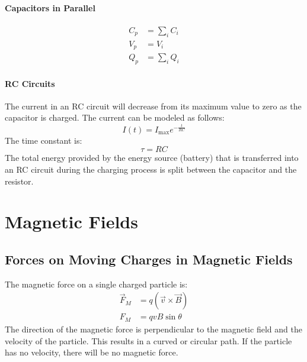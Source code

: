 \documentclass{article}
\begin{document}
            \paragraph{Capacitors in Parallel}
            \begin{align}
                C_p &= \sum_i C_i \\
                V_p &= V_i \\
                Q_p &= \sum_i Q_i
            \end{align}

            \paragraph{RC Circuits}
            The current in an RC circuit will decrease from its maximum value to zero as the capacitor is charged. The current can be modeled as follows:
            \begin{equation}
                I(t) = I_\text{max} e^{- \frac{t}{RC}}
            \end{equation}
            The time constant is:
            \begin{equation}
                \tau = RC
            \end{equation}
            The total energy provided by the energy source (battery) that is transferred into an RC circuit during the charging process is split between the capacitor and the resistor.

    \section{Magnetic Fields}

        \subsection{Forces on Moving Charges in Magnetic Fields}
            The magnetic force on a single charged particle is:
            \begin{align}
                \vec{F}_M &= q \left( \vec{v} \times \vec{B} \right) \\
                F_M &= q v B \sin \theta
            \end{align}
            The direction of the magnetic force is perpendicular to the magnetic field and the velocity of the particle. This results in a curved or circular path. If the particle has no velocity, there will be no magnetic force.
\end{document}

